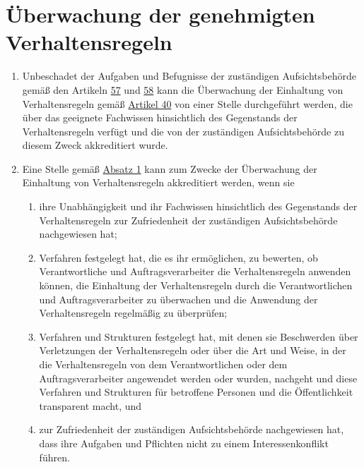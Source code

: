 \chapter{Überwachung der genehmigten Verhaltensregeln}
\label{ch:41}


\begin{enumerate}

  \item Unbeschadet der Aufgaben und Befugnisse der zuständigen Aufsichtsbehörde gemäß den Artikeln \hyperref[ch:57]
   {57} und \hyperref[ch:58]{58} kann die Überwachung der Einhaltung von Verhaltensregeln gemäß \hyperref[ch:40]
   {Artikel 40} von einer Stelle durchgeführt werden, die über das geeignete Fachwissen hinsichtlich des Gegenstands
   der Verhaltensregeln verfügt und die von der zuständigen Aufsichtsbehörde zu diesem Zweck akkreditiert wurde.
  \label{itm:41-1}

  \item Eine Stelle gemäß \hyperref[itm:41-1]{Absatz 1} kann zum Zwecke der Überwachung der Einhaltung von
   Verhaltensregeln akkreditiert werden, wenn sie
  \label{itm:41-2}

  \begin{enumerate}
  
    \item ihre Unabhängigkeit und ihr Fachwissen hinsichtlich des Gegenstands der Verhaltensregeln zur Zufriedenheit der
     zuständigen Aufsichtsbehörde nachgewiesen hat;
    \label{itm:41-2a}

    \item Verfahren festgelegt hat, die es ihr ermöglichen, zu bewerten, ob Verantwortliche und Auftragsverarbeiter die
     Verhaltensregeln anwenden können, die Einhaltung der Verhaltensregeln durch die Verantwortlichen und
     Auftragsverarbeiter zu überwachen und die Anwendung der Verhaltensregeln regelmäßig zu überprüfen;
    \label{itm:41-2b}

    \item Verfahren und Strukturen festgelegt hat, mit denen sie Beschwerden über Verletzungen der Verhaltensregeln oder
     über die Art und Weise, in der die Verhaltensregeln von dem Verantwortlichen oder dem Auftragsverarbeiter
     angewendet werden oder wurden, nachgeht und diese Verfahren und Strukturen für betroffene Personen und die
     Öffentlichkeit transparent macht, und
    \label{itm:41-2c}

    \item zur Zufriedenheit der zuständigen Aufsichtsbehörde nachgewiesen hat, dass ihre Aufgaben und Pflichten nicht zu
     einem Interessenkonflikt führen.
    \label{itm:41-2d}


\end{enumerate}
\end{enumerate}
